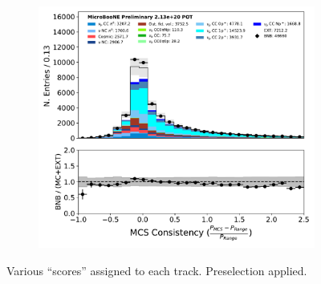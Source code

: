\begin{figure}[H]
\begin{subfigure}[b]{0.3\textwidth}
        \end{subfigure}
        \begin{subfigure}[b]{0.3\textwidth}
        \centering
        \includegraphics[width=\textwidth]{NuMuCCsel/Images/Ryan/appendix_muonsel_input_R3/trk_p_quality_v_07232020_presel_samples_detsys_event_category.pdf}
        \end{subfigure}
    \caption{Various ``scores'' assigned to each track. Preselection applied.}
    \label{fig::Appendix::constraint:inputvars:scores}
\end{figure}

